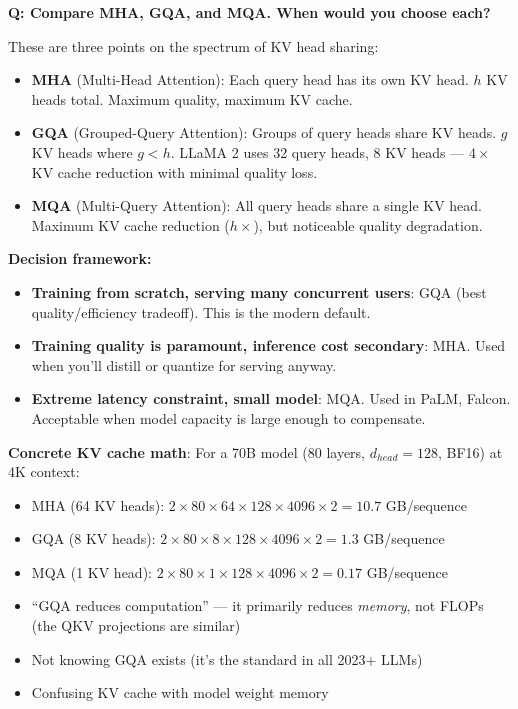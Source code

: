 \begin{interviewq}
\textbf{Q: Compare MHA, GQA, and MQA. When would you choose each?}

 \quad {} \quad \badgefreq{\freqhigh}

\stronganswer These are three points on the spectrum of KV head sharing:

\begin{itemize}
    \item \textbf{MHA} (Multi-Head Attention): Each query head has its own KV head. $h$ KV heads total. Maximum quality, maximum KV cache.
    \item \textbf{GQA} (Grouped-Query Attention): Groups of query heads share KV heads. $g$ KV heads where $g < h$. LLaMA 2 uses 32 query heads, 8 KV heads --- $4\times$ KV cache reduction with minimal quality loss.
    \item \textbf{MQA} (Multi-Query Attention): All query heads share a single KV head. Maximum KV cache reduction ($h\times$), but noticeable quality degradation.
\end{itemize}

\textbf{Decision framework:}
\begin{itemize}
    \item \textbf{Training from scratch, serving many concurrent users}: GQA (best quality/efficiency tradeoff). This is the modern default.
    \item \textbf{Training quality is paramount, inference cost secondary}: MHA. Used when you'll distill or quantize for serving anyway.
    \item \textbf{Extreme latency constraint, small model}: MQA. Used in PaLM, Falcon. Acceptable when model capacity is large enough to compensate.
\end{itemize}

\textbf{Concrete KV cache math}: For a 70B model (80 layers, $d_{head}=128$, BF16) at 4K context:
\begin{itemize}
    \item MHA (64 KV heads): $2 \times 80 \times 64 \times 128 \times 4096 \times 2 = 10.7$ GB/sequence
    \item GQA (8 KV heads): $2 \times 80 \times 8 \times 128 \times 4096 \times 2 = 1.3$ GB/sequence
    \item MQA (1 KV head): $2 \times 80 \times 1 \times 128 \times 4096 \times 2 = 0.17$ GB/sequence
\end{itemize}

\redflags
\begin{itemize}
    \item ``GQA reduces computation'' --- it primarily reduces \textit{memory}, not FLOPs (the QKV projections are similar)
    \item Not knowing GQA exists (it's the standard in all 2023+ LLMs)
    \item Confusing KV cache with model weight memory
\end{itemize}


\end{interviewq}
